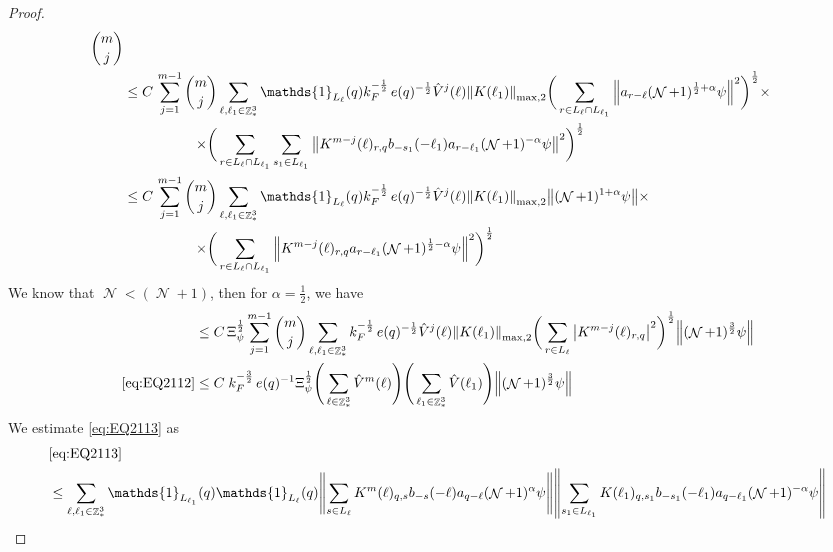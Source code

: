 \documentclass[sn-mathphys, Numbered ,a4paper]{sn-jnl}%
\DeclareMathOperator{\Z}{\mathbb{Z}}
\DeclareMathOperator{\NN}{\mathcal{N}}
\newcommand{\half}{\frac{1}{2}}
\newcommand{\normmaxii}[1]{\norm{#1}_{\mathrm{max,2}}}
\theoremstyle{plain}
\theoremstyle{definition}
\theoremstyle{remark}
\theoremstyle{plain}
\theoremstyle{definition}
\theoremstyle{remark}
\begin{document}
\begin{proof}
\begin{alignat}{2}
\begin{aligned}[t] {{m}\choose j}
    \end{aligned} \nonumber\\   
	&\leq C\, \sum\limits_{j=1}^{m-1} \begin{aligned}[t]{{m}\choose j} &\sum\limits_{\ell,\ell_1 \in \Z^3_*} \mathds{1}_{L_{\ell}}(q) k_F^{-\half}\, e(q)^{-\half} \hat{V}^{j}(\ell) \normmaxii{K(\ell_1)} \bigg( \sum\limits_{r\in L_{\ell} \cap L_{\ell_1}} \norm{ a_{r-\ell} (\NN+1)^{\half+\alpha}\psi}^2\bigg)^\half \times \nonumber\\ \times 
    \bigg( &\sum\limits_{r\in L_{\ell} \cap L_{\ell_1}} \sum\limits_{s_1 \in L_{\ell_1}}\norm{ K^{m-j}(\ell)_{r,q}  b_{-s_1}(-\ell_1)  a_{r-\ell_1} (\NN+1)^{-\alpha}\psi }^2\bigg)^\half
	\end{aligned} \nonumber\\
	&\leq C\, \sum\limits_{j=1}^{m-1} \begin{aligned}[t]{{m}\choose j} &\sum\limits_{\ell,\ell_1 \in \Z^3_*} \mathds{1}_{L_{\ell}}(q)  k_F^{-\half}\, e(q)^{-\half} \hat{V}^{j}(\ell) \normmaxii{K(\ell_1)}  
	 \norm{ (\NN+1)^{1+\alpha}\psi} \times \nonumber\\ \times 
	\bigg( &\sum\limits_{r\in L_{\ell}\cap L_{\ell_1}}  \norm{ K^{m-j}(\ell)_{r,q} a_{r-\ell_1} (\NN+1)^{\half-\alpha}\psi }^2\bigg)^\half \end{aligned} \nonumber\\
\end{alignat}
We know that $\NN<(\NN+1)$, then for $\alpha = \half$, we have
\begin{alignat}{2}
	&\leq C\, \Xi_{\psi}^\half\sum\limits_{j=1}^{m-1} {{m}\choose j} \sum\limits_{\ell, \ell_1\in \Z^3_*}  k_F^{-\half}\, e(q)^{-\half} \hat{V}^{j}(\ell)  \normmaxii{K(\ell_1)} \bigg(\sum\limits_{r\in L_\ell}  \abs{ K^{m-j}(\ell)_{r,q} }^2\bigg)^\half \norm{(\NN+1)^\frac{3}{2} \psi}  \nonumber\\
  	\eqref{eq:EQ2112}&\leq C\; k_F^{-\frac{3}{2}}\, e(q)^{-1} \Xi_{\psi}^\half \Bigg( \sum\limits_{\ell \in \Z^3_*}  \hat{V}^{m}(\ell) \Bigg) \Bigg(\sum\limits_{ \ell_1\in \Z^3_*} \hat{V}(\ell_1)\Bigg)  \norm{(\NN+1)^{\frac{3}{2}} \psi} \label{eq:estEQ2112}
  \end{alignat} 
We estimate \eqref{eq:EQ2113} as
\begin{align}
	&\eqref{eq:EQ2113}\nonumber\\
	&\leq\sum\limits_{\ell, \ell_1\in \Z^3_*} \mathds{1}_{L_{\ell_1}}(q) \mathds{1}_{L_{\ell}}(q)  \norm{ \sum\limits_{s\in L_{\ell}} K^m(\ell)_{q,s} b_{-s}(-\ell) a_{q-\ell}(\NN+1)^{\alpha}\psi}\norm{ \sum\limits_{s_1 \in L_{\ell_1}} K(\ell_1)_{q,s_1} b_{-s_1}(-\ell_1)a_{q-\ell_1} (\NN+1)^{-\alpha} \psi }\nonumber\\

\end{align}
\end{proof}
\end{document}
